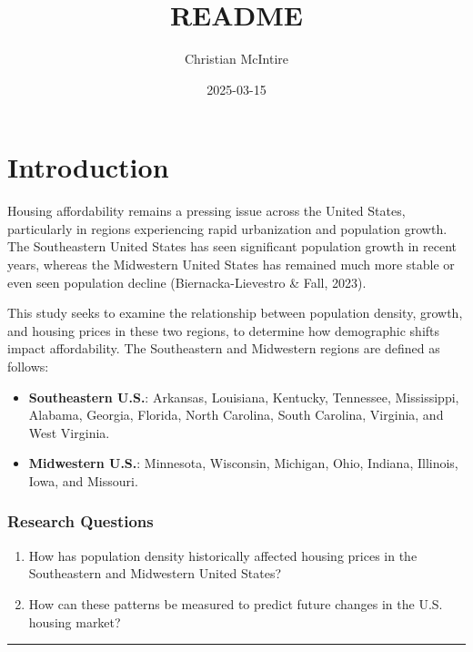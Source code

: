 \documentclass[
]{article}
\title{README}
\author{Christian McIntire}
\date{2025-03-15}
\providecommand{\tightlist}{%
  \setlength{\itemsep}{0pt}\setlength{\parskip}{0pt}}
\begin{document}
\maketitle

\section{\texorpdfstring{\textbf{Introduction}}{Introduction}}\label{introduction}

Housing affordability remains a pressing issue across the United States,
particularly in regions experiencing rapid urbanization and population
growth. The Southeastern United States has seen significant population
growth in recent years, whereas the Midwestern United States has
remained much more stable or even seen population decline
(Biernacka-Lievestro \& Fall, 2023).

This study seeks to examine the relationship between population density,
growth, and housing prices in these two regions, to determine how
demographic shifts impact affordability. The Southeastern and Midwestern
regions are defined as follows:

\begin{itemize}
\tightlist
\item
  \textbf{Southeastern U.S.}: Arkansas, Louisiana, Kentucky, Tennessee,
  Mississippi, Alabama, Georgia, Florida, North Carolina, South
  Carolina, Virginia, and West Virginia.
\item
  \textbf{Midwestern U.S.}: Minnesota, Wisconsin, Michigan, Ohio,
  Indiana, Illinois, Iowa, and Missouri.
\end{itemize}

\subsubsection{\texorpdfstring{\textbf{Research
Questions}}{Research Questions}}\label{research-questions}

\begin{enumerate}
\def\labelenumi{\arabic{enumi}.}
\tightlist
\item
  How has population density historically affected housing prices in the
  Southeastern and Midwestern United States?
\item
  How can these patterns be measured to predict future changes in the
  U.S. housing market?
\end{enumerate}

\begin{center}\rule{0.5\linewidth}{0.5pt}\end{center}
\end{document}
